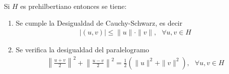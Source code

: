\begin{prop}
    Si $H$ es prehilbertiano entonces se tiene:
    \begin{enumerate}
        \item Se cumple la Desigualdad de Cauchy-Schwarz, es decir
        \begin{gather*}
            |(u,v)| \leq \|u\| \cdot \|v\|, \ \ \ \forall u,v\in H
        \end{gather*}
        \item Se verifica la desigualdad del paralelogramo
        \begin{gather*}
            \left\| \frac{u+v}{2} \right\|^2 + \left\| \frac{u-v}{2} \right\|^2 = \frac{1}{2}\left(\|u\|^2 + \|v\|^2\right), \ \ \ \forall u,v\in H
        \end{gather*}
    \end{enumerate}
\end{prop}

